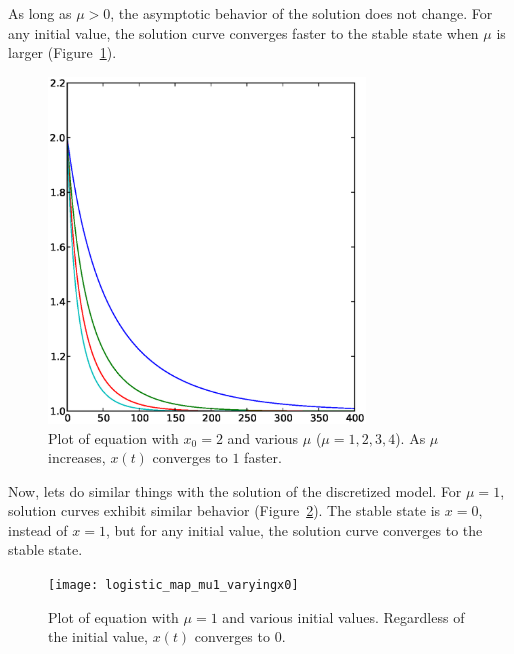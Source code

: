 \documentclass[12pt,twoside]{book}
\begin{document}
%
As long as $\mu > 0$, the asymptotic behavior of the solution does not change.
For any initial value, the solution curve converges faster to the stable state when $\mu$ is larger (Figure~\ref{fig:lde2}).
\begin{figure}[h]
  \begin{center}
    \includegraphics[width=0.75\textwidth]{logistic_diffeq_mu1234_x2}
  \end{center}
  \caption{
    Plot of equation  with $x_0 = 2$ and various $\mu$ ($\mu = 1,2,3,4$).
    As $\mu$ increases, $x(t)$ converges to $1$ faster.
  }
  \label{fig:lde2}
\end{figure}
Now, lets do similar things with the solution of the discretized model.
For $\mu = 1$, solution curves exhibit similar behavior (Figure~\ref{fig:logistic1}).
The stable state is $x = 0$, instead of $x = 1$, but for any initial value, the solution curve converges to the stable state.
\begin{figure}[ht]
  \begin{center}
    \texttt{[image: logistic\_map\_mu1\_varyingx0]}
  \end{center}
  \caption{
    Plot of equation  with $\mu = 1$ and various initial values. 
    Regardless of the initial value, $x(t)$ converges to $0$.
}
  \label{fig:logistic1}
\end{figure}
\end{document}
